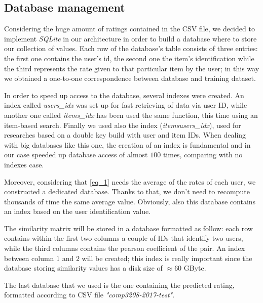 \subsection{Database management}

Considering the huge amount of ratings contained in the CSV file, we decided to implement \textit{SQLite} in our architecture in order to build a database where to store our collection of values. Each row of the database's table consists of three entries: the first one contains the user's id, the second one the item's identification while the third represents the rate given to that particular item by the user; in this way we obtained a one-to-one correspondence between database and training dataset. 

In order to speed up access to the database, several indexes were created. An index called \textit{users\_idx} was set up for fast retrieving of data via user ID, while another one called \textit{items\_idx} has been used the same function, this time using an item-based search. Finally we used also the index (\textit{itemsusers\_idx}), used for researches based on a double key build with user and item IDs. When dealing with big databases like this one, the creation of an index is fundamental and in our case speeded up database access of almost $100$ times, comparing with no indexes case.

Moreover, considering that \ref{eq_1} needs the average of the rates of each user, we constructed a dedicated database. Thanks to that, we don't need to recompute thousands of time the same average value. Obviously, also this database contains an index based on the user identification value. 

The similarity matrix will be stored in a database formatted as follow: each row contains within the first two columns a couple of IDs that identify two users, while the third columns contains the pearson coefficient of the pair. An index between column $1$ and $2$ will be created; this index is really important since the database storing similarity values has a disk size of $\approx 60$ GByte. 

The last database that we used is the one containing the predicted rating, formatted according to CSV file \textit{"comp3208-2017-test"}.

